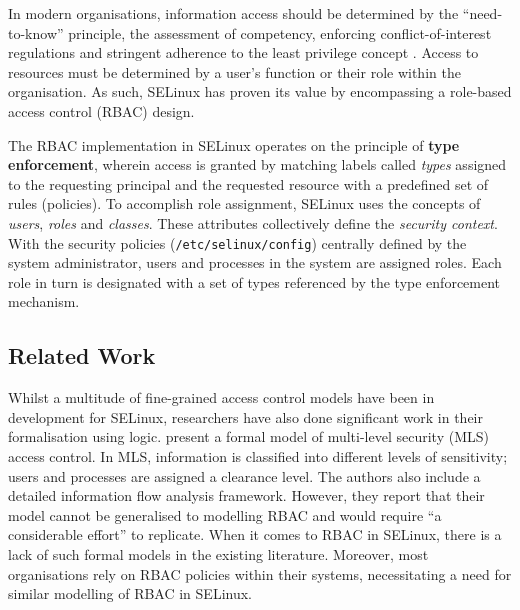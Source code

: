 \documentclass[acmsmall,screen,nonacm]{acmart}
\begin{document}
In modern organisations, information access should be determined by the 
``need-to-know'' principle, the assessment of competency, enforcing 
conflict-of-interest regulations and stringent adherence to the least privilege 
concept \cite{rbac-nist}. Access to resources must be determined by a user's 
function or their role within the organisation. As such, SELinux has proven its 
value by encompassing a role-based access control (RBAC) design.

The RBAC implementation in SELinux operates on the principle of \textbf{type 
enforcement}, wherein access is granted by matching labels called 
\textit{types} assigned to the requesting principal and the requested resource 
with a predefined set of rules (policies). To accomplish role assignment, 
SELinux uses the concepts of \textit{users}, \textit{roles} and 
\textit{classes}. These attributes collectively define the \textit{security 
context}. With the security policies (\texttt{/etc/selinux/config}) centrally 
defined by the system administrator, users and processes in the system are 
assigned roles. Each role in turn is designated with a set of types referenced 
by the type enforcement mechanism.

\subsection{Related Work}

Whilst a multitude of fine-grained access control models have been in 
development for SELinux, researchers have also done significant work in their 
formalisation using logic. \citet{MLS} present a formal model of multi-level 
security (MLS) access control. In MLS, information is classified into different 
levels of sensitivity; users and processes are assigned a clearance level. The 
authors also include a detailed information flow analysis framework. However, 
they report that their model cannot be generalised to modelling RBAC and would 
require ``a considerable effort'' to replicate. When it comes to RBAC in 
SELinux, there is a lack of such formal models in the existing literature. 
Moreover, most organisations rely on RBAC policies within their systems, 
necessitating a need for similar modelling of RBAC in SELinux.
\end{document}

